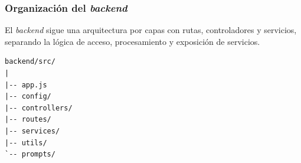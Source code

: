 




\subsubsection{Organización del \textit{backend}}

El \textit{backend} sigue una arquitectura por capas con rutas, controladores y servicios, separando la lógica de acceso, procesamiento y exposición de servicios.

\begin{lstlisting}[caption={Estructura del backend.}]
backend/src/
|
|-- app.js
|-- config/
|-- controllers/
|-- routes/
|-- services/
|-- utils/
`-- prompts/
\end{lstlisting}

